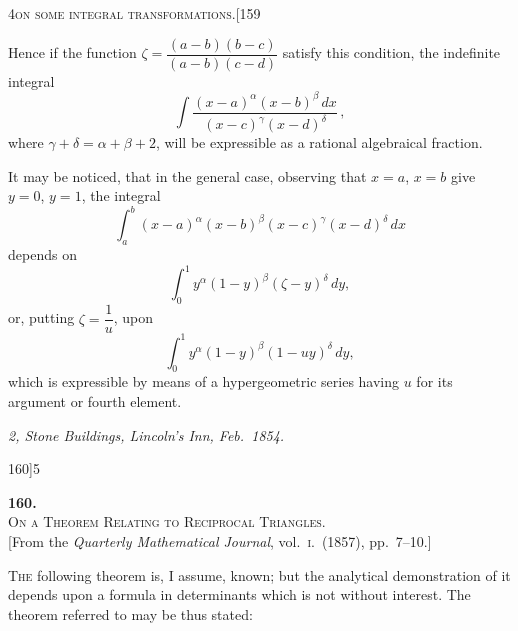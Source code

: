 \documentclass[11pt]{article}
\begin{document}
\begin{center}
\small\textsc{4}\hfill\textsc{on some integral transformations.}\hfill[159
\end{center}

\medskip

\noindent Hence if the function $\zeta = \dfrac{(a-b)(b-c)}{(a-b)(c-d)}$ satisfy this condition, the indefinite integral
\[
\int \frac{(x-a)^{\alpha}(x-b)^{\beta}\, dx}{(x-c)^{\gamma}(x-d)^{\delta}}\,,
\]
where $\gamma + \delta = \alpha + \beta + 2$, will be expressible as a rational algebraical fraction.

It may be noticed, that in the general case, observing that $x=a$, $x=b$ give $y=0$, $y=1$, the integral
\[
\int_{a}^{b} (x-a)^{\alpha}(x-b)^{\beta}(x-c)^{\gamma}(x-d)^{\delta}\, dx
\]
depends on
\[
\int_{0}^{1} y^{\alpha}(1-y)^{\beta}(\zeta-y)^{\delta}\, dy,
\]
or, putting $\zeta = \dfrac{1}{u}$, upon
\[
\int_{0}^{1} y^{\alpha}(1-y)^{\beta}(1-uy)^{\delta}\, dy,
\]
which is expressible by means of a hypergeometric series having $u$ for its argument or fourth element.

\bigskip

\noindent\textit{2, Stone Buildings, Lincoln's Inn, Feb.\ 1854.}

\newpage

\begin{center}
\small 160]\hfill\textsc{5}
\end{center}

\bigskip

\begin{center}
{\large\textbf{160.}}\\[1em]
{\large\scshape On a Theorem Relating to Reciprocal Triangles.}\\[1em]
{\small [From the \textit{Quarterly Mathematical Journal}, vol.~\textsc{i}.\ (1857), pp.~7--10.]}
\end{center}

\bigskip

\textsc{The} following theorem is, I assume, known; but the analytical demonstration of
it depends upon a formula in determinants which is not without interest. The theorem
referred to may be thus stated:
\end{document}

